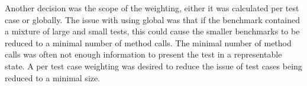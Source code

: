 Another decision was the scope of the weighting, either it was calculated per test case or globally. The issue with using global was that if the benchmark contained a mixture of large and small tests, this could cause the smaller benchmarks to be reduced to a minimal number of method calls. The minimal number of method calls was often not enough information to present the test in a representable state. A per test case weighting was desired to reduce the issue of test cases being reduced to a minimal size.
